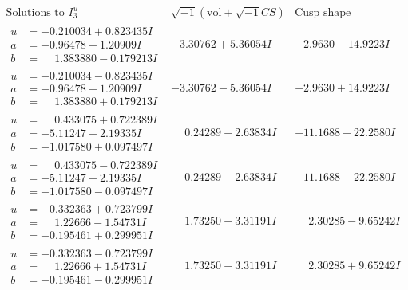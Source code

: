 \documentclass[1p]{elsarticle_modified}
\theoremstyle{definition}
\newcommand{\I}{\sqrt{-1}}
\begin{document}
$$\begin{array}{c|c|c}  
\text{Solutions to }I^u_{3}& \I (\text{vol} + \sqrt{-1}CS) & \text{Cusp shape}\\
 \hline 
\begin{aligned}
u &= -0.210034 + 0.823435 I \\
a &= -0.96478 + 1.20909 I \\
b &= \phantom{-}1.383880 - 0.179213 I\end{aligned}
 & -3.30762 + 5.36054 I & -2.9630 - 14.9223 I \\ \hline\begin{aligned}
u &= -0.210034 - 0.823435 I \\
a &= -0.96478 - 1.20909 I \\
b &= \phantom{-}1.383880 + 0.179213 I\end{aligned}
 & -3.30762 - 5.36054 I & -2.9630 + 14.9223 I \\ \hline\begin{aligned}
u &= \phantom{-}0.433075 + 0.722389 I \\
a &= -5.11247 + 2.19335 I \\
b &= -1.017580 + 0.097497 I\end{aligned}
 & \phantom{-}0.24289 - 2.63834 I & -11.1688 + 22.2580 I \\ \hline\begin{aligned}
u &= \phantom{-}0.433075 - 0.722389 I \\
a &= -5.11247 - 2.19335 I \\
b &= -1.017580 - 0.097497 I\end{aligned}
 & \phantom{-}0.24289 + 2.63834 I & -11.1688 - 22.2580 I \\ \hline\begin{aligned}
u &= -0.332363 + 0.723799 I \\
a &= \phantom{-}1.22666 - 1.54731 I \\
b &= -0.195461 + 0.299951 I\end{aligned}
 & \phantom{-}1.73250 + 3.31191 I & \phantom{-}2.30285 - 9.65242 I \\ \hline\begin{aligned}
u &= -0.332363 - 0.723799 I \\
a &= \phantom{-}1.22666 + 1.54731 I \\
b &= -0.195461 - 0.299951 I\end{aligned}
 & \phantom{-}1.73250 - 3.31191 I & \phantom{-}2.30285 + 9.65242 I \\ \hline\begin{aligned}

\end{aligned}
\end{array}$$
\end{document}
